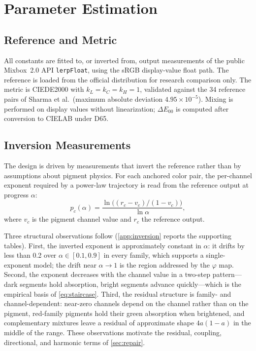 \section{Parameter Estimation}
\label{sec:estimation}

\subsection{Reference and Metric}
\label{sec:reference}

All constants are fitted to, or inverted from, output measurements of the public Mixbox~2.0 API \texttt{lerpFloat}, using the sRGB display-value float path. The reference is loaded from the official distribution for research comparison only. The metric is CIEDE2000 \cite{sharma2005} with $k_{L}=k_{C}=k_{H}=1$, validated against the 34 reference pairs of Sharma et al.\ (maximum absolute deviation $4.95\times10^{-5}$). Mixing is performed on display values without linearization; $\Delta E_{00}$ is computed after conversion to CIELAB under D65.

\subsection{Inversion Measurements}
\label{sec:inversion}

The design is driven by measurements that invert the reference rather than by assumptions about pigment physics. For each anchored color pair, the per-channel exponent required by a power-law trajectory is read from the reference output at progress $\alpha$:
\begin{equation}
p_{c}(\alpha)=\frac{\ln\bigl((r_{c}-v_{c})/(1-v_{c})\bigr)}{\ln\alpha},
\label{eq:inversion}
\end{equation}
where $v_{c}$ is the pigment channel value and $r_{c}$ the reference output.

Three structural observations follow (\cref{app:inversion} reports the supporting tables). First, the inverted exponent is approximately constant in $\alpha$: it drifts by less than 0.2 over $\alpha\in[0.1,0.9]$ in every family, which supports a single-exponent model; the drift near $\alpha\to1$ is the region addressed by the $\varphi$ map. Second, the exponent decreases with the channel value in a two-step pattern---dark segments hold absorption, bright segments advance quickly---which is the empirical basis of \cref{eq:staircase}. Third, the residual structure is family- and channel-dependent: near-zero channels depend on the channel rather than on the pigment, red-family pigments hold their green absorption when brightened, and complementary mixtures leave a residual of approximate shape $4a(1-a)$ in the middle of the range. These observations motivate the residual, coupling, directional, and harmonic terms of \cref{sec:repair}.


